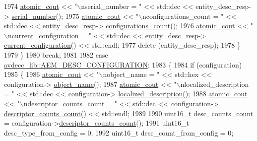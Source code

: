 \begin{DoxyCode}
1974             \hyperlink{cmd__line_8h_a0bc38ccc65c79ba06c6fcd7b4bf554c3}{atomic\_cout} << \textcolor{stringliteral}{"\(\backslash\)nserial\_number = "} << std::dec << entity\_desc\_resp->
      \hyperlink{classavdecc__lib_1_1entity__descriptor__response_a4fa3300b2a421166c09e3054d1fa53da}{serial\_number}();
1975             \hyperlink{cmd__line_8h_a0bc38ccc65c79ba06c6fcd7b4bf554c3}{atomic\_cout} << \textcolor{stringliteral}{"\(\backslash\)nconfigurations\_count = "} << std::dec << entity\_desc\_resp->
      \hyperlink{classavdecc__lib_1_1entity__descriptor__response_a620aa7f49c2fedf1d085b1b798c80def}{configurations\_count}();
1976             \hyperlink{cmd__line_8h_a0bc38ccc65c79ba06c6fcd7b4bf554c3}{atomic\_cout} << \textcolor{stringliteral}{"\(\backslash\)ncurrent\_configuration = "} << std::dec << entity\_desc\_resp->
      \hyperlink{classavdecc__lib_1_1entity__descriptor__response_accc7abf433b3e1ec5eaeae28f8ac91d5}{current\_configuration}() << std::endl;
1977             \textcolor{keyword}{delete} (entity\_desc\_resp);
1978         \}
1979     \}
1980     \textcolor{keywordflow}{break};
1981 
1982     \textcolor{keywordflow}{case} \hyperlink{namespaceavdecc__lib_ac7b7d227e46bc72b63ee9e9aae15902fab391827cda146b0d4199adf80f47117a}{avdecc\_lib::AEM\_DESC\_CONFIGURATION}:
1983     \{
1984         \textcolor{keywordflow}{if} (configuration)
1985         \{
1986             \hyperlink{cmd__line_8h_a0bc38ccc65c79ba06c6fcd7b4bf554c3}{atomic\_cout} << \textcolor{stringliteral}{"\(\backslash\)nobject\_name = "} << std::hex << configuration->
      \hyperlink{classavdecc__lib_1_1configuration__descriptor_a133f7774946d80f82b8aaaa4cfbb7361}{object\_name}();
1987             \hyperlink{cmd__line_8h_a0bc38ccc65c79ba06c6fcd7b4bf554c3}{atomic\_cout} << \textcolor{stringliteral}{"\(\backslash\)nlocalized\_description = "} << std::dec << configuration->
      \hyperlink{classavdecc__lib_1_1descriptor__base_a1fb9de45567df344090a1407aa6b775f}{localized\_description}();
1988             \hyperlink{cmd__line_8h_a0bc38ccc65c79ba06c6fcd7b4bf554c3}{atomic\_cout} << \textcolor{stringliteral}{"\(\backslash\)ndescriptor\_counts\_count = "} << std::dec << configuration->
      \hyperlink{classavdecc__lib_1_1configuration__descriptor_ac79e004a8615b2ac588c8bdf1694508d}{descriptor\_counts\_count}() << std::endl;
1989 
1990             uint16\_t desc\_counts\_count = configuration->\hyperlink{classavdecc__lib_1_1configuration__descriptor_ac79e004a8615b2ac588c8bdf1694508d}{descriptor\_counts\_count}();
1991             uint16\_t desc\_type\_from\_config = 0;
1992             uint16\_t desc\_count\_from\_config = 0;

\end{DoxyCode}
